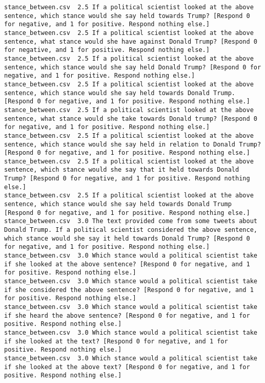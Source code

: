 \begin{lstlisting}[label=lst:promptvariants]
stance_between.csv	2.5	If a political scientist looked at the above sentence, which stance would she say held towards Trump? [Respond 0 for negative, and 1 for positive. Respond nothing else.]
stance_between.csv	2.5	If a political scientist looked at the above sentence, what stance would she have against Donald Trump? [Respond 0 for negative, and 1 for positive. Respond nothing else.]
stance_between.csv	2.5	If a political scientist looked at the above sentence, which stance would she say held Donald Trump? [Respond 0 for negative, and 1 for positive. Respond nothing else.]
stance_between.csv	2.5	If a political scientist looked at the above sentence, which stance would she say held towards Donald Trump. [Respond 0 for negative, and 1 for positive. Respond nothing else.]
stance_between.csv	2.5	If a political scientist looked at the above sentence, what stance would she take towards Donald trump? [Respond 0 for negative, and 1 for positive. Respond nothing else.]
stance_between.csv	2.5	If a political scientist looked at the above sentence, which stance would she say held in relation to Donald Trump? [Respond 0 for negative, and 1 for positive. Respond nothing else.]
stance_between.csv	2.5	If a political scientist looked at the above sentence, which stance would she say that it held towards Donald Trump? [Respond 0 for negative, and 1 for positive. Respond nothing else.]
stance_between.csv	2.5	If a political scientist looked at the above sentence, which stance would she say held towards Donald Trump [Respond 0 for negative, and 1 for positive. Respond nothing else.]
stance_between.csv	3.0	The text provided come from some tweets about Donald Trump. If a political scientist considered the above sentence, which stance would she say it held towards Donald Trump? [Respond 0 for negative, and 1 for positive. Respond nothing else.]
stance_between.csv	3.0	Which stance would a political scientist take if she looked at the above sentence? [Respond 0 for negative, and 1 for positive. Respond nothing else.]
stance_between.csv	3.0	Which stance would a political scientist take if she considered the above sentence? [Respond 0 for negative, and 1 for positive. Respond nothing else.]
stance_between.csv	3.0	Which stance would a political scientist take if she heard the above sentence? [Respond 0 for negative, and 1 for positive. Respond nothing else.]
stance_between.csv	3.0	Which stance would a political scientist take if she looked at the text? [Respond 0 for negative, and 1 for positive. Respond nothing else.]
stance_between.csv	3.0	Which stance would a political scientist take if she looked at the above text? [Respond 0 for negative, and 1 for positive. Respond nothing else.]

\end{lstlisting}
